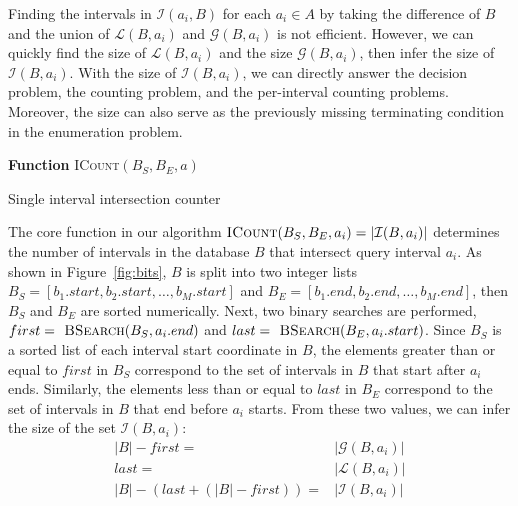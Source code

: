 \documentclass{bioinfo}
\begin{document}
	Finding the intervals in $\mathcal{I}(a_i,B)$ for each $a_i\in A$ by
	taking the difference of $B$ and the union of $\mathcal{L}(B,a_i)$ and
	$\mathcal{G}(B,a_i)$ is not efficient.  However, we can quickly find
	the size of $\mathcal{L}(B,a_i)$ and the size $\mathcal{G}(B,a_i)$,
	then infer the size of $\mathcal{I}(B,a_i)$.  With the size of
	$\mathcal{I}(B,a_i)$, we can directly answer the decision problem, the
	counting problem, and the per-interval counting problems.  Moreover,
	the size can also serve as the previously missing terminating
	condition in the enumeration problem.

	\begin{algorithm}[h]
		\DontPrintSemicolon
		\footnotesize
		\BlankLine
		\textbf{Function} \textsc{ICount}$(B_S,B_E,a)$
		\caption{Single interval intersection counter}
	\end{algorithm}

	The core function in our algorithm 
	$\textsc{ICount}(B_S,B_E,a_i) = |\mathcal{I}(B,a_i)|$ determines the number of
	intervals in the database $B$ that intersect query interval $a_i$.  As shown in
	Figure~\ref{fig:bits}, $B$ is split into two integer lists 
	$B_S = [b_1.start, b_2.start, \dots, b_M.start]$ and 
	$B_E = [b_1.end, b_2.end, \dots, b_M.end]$, then $B_S$ and $B_E$ are sorted
	numerically.  Next, two binary searches are performed,
	$first=\textsc{ BSearch}(B_S, a_i.end)$ and 
	$last=\textsc{ BSearch}(B_E,
	a_i.start)$.  Since $B_S$ is a sorted list of each interval start coordinate in
	$B$, the elements greater than or equal to $first$ in $B_S$ correspond to the
	set of intervals in $B$ that start after $a_i$ ends.  Similarly, the elements
	less than or equal to $last$ in $B_E$ correspond to the set of intervals in $B$
	that end before $a_i$ starts.  From these two values, we can infer the size of
	the set $\mathcal{I}(B,a_i)$:
	\begin{equation*}
		\begin{split}
			|B|-first=&|\mathcal{G}(B,a_i)| \\
			last=&|\mathcal{L}(B,a_i)| \\ 
			|B|-(last+(|B|-first))=&|\mathcal{I}(B,a_i)|
		\end{split}
	\end{equation*}
\end{document}
